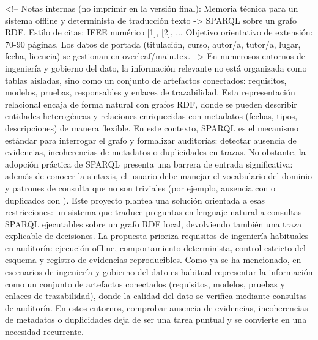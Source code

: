 <!-- Notas internas (no imprimir en la versión final):\markdownRendererInterblockSeparator
{}\markdownRendererUlBeginTight
\markdownRendererUlItem Memoria técnica para un sistema offline y determinista de traducción texto -> SPARQL sobre un grafo RDF.\markdownRendererUlItemEnd 
\markdownRendererUlItem Estilo de citas: IEEE numérico [1], [2], ...\markdownRendererUlItemEnd 
\markdownRendererUlItem Objetivo orientativo de extensión: 70-90 páginas.\markdownRendererUlItemEnd 
\markdownRendererUlEndTight \markdownRendererInterblockSeparator
{}Los datos de portada (titulación, curso, autor/a, tutor/a, lugar, fecha, licencia) se gestionan en overleaf/main.tex. -->\markdownRendererInterblockSeparator
{}\markdownRendererInterblockSeparator
{}En numerosos entornos de ingeniería y gobierno del dato, la información relevante no está organizada como tablas aisladas, sino como un conjunto de artefactos conectados: requisitos, modelos, pruebas, responsables y enlaces de trazabilidad. Esta representación relacional encaja de forma natural con grafos RDF, donde se pueden describir entidades heterogéneas y relaciones enriquecidas con metadatos (fechas, tipos, descripciones) de manera flexible.\markdownRendererInterblockSeparator
{}En este contexto, SPARQL es el mecanismo estándar para interrogar el grafo y formalizar auditorías: detectar ausencia de evidencias, incoherencias de metadatos o duplicidades en trazas. No obstante, la adopción práctica de SPARQL presenta una barrera de entrada significativa: además de conocer la sintaxis, el usuario debe manejar el vocabulario del dominio y patrones de consulta que no son triviales (por ejemplo, ausencia con  o duplicados con ).\markdownRendererInterblockSeparator
{}Este proyecto plantea una solución orientada a esas restricciones: un sistema que traduce preguntas en lenguaje natural a consultas SPARQL ejecutables sobre un grafo RDF local, devolviendo también una traza explicable de decisiones. La propuesta prioriza requisitos de ingeniería habituales en auditoría: ejecución offline, comportamiento determinista, control estricto del esquema y registro de evidencias reproducibles.\markdownRendererInterblockSeparator
{}\markdownRendererInterblockSeparator
{}Como ya se ha mencionado, en escenarios de ingeniería y gobierno del dato es habitual representar la información como un conjunto de artefactos conectados (requisitos, modelos, pruebas y enlaces de trazabilidad), donde la calidad del dato se verifica mediante consultas de auditoría. En estos entornos, comprobar ausencia de evidencias, incoherencias de metadatos o duplicidades deja de ser una tarea puntual y se convierte en una necesidad recurrente.\markdownRendererInterblockSeparator
